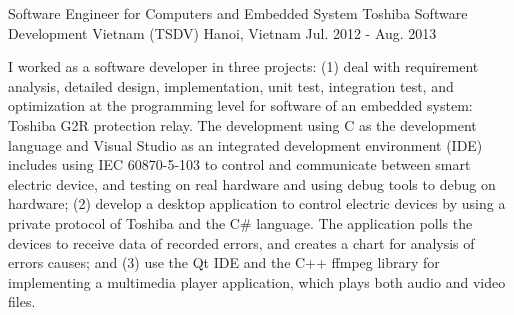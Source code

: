 \begin{cventries}
\cventry
{Software Engineer for Computers and Embedded System} %
{Toshiba Software Development Vietnam (TSDV)} %
{Hanoi, Vietnam} %
{Jul. 2012 - Aug. 2013} %
{ %
	\begin{cvitems}
		\item {I worked as a software developer in three projects: (1) deal with requirement analysis, detailed design, implementation, unit test, integration test, and optimization at the programming level for software of an embedded system: Toshiba G2R protection relay. The development using C as the development language and Visual Studio as an integrated development environment (IDE) includes using IEC 60870-5-103 to control and communicate between smart electric device, and testing on real hardware and using debug tools to debug on hardware; (2) develop a desktop application to control electric devices by using a private protocol of Toshiba and the C\# language. The application polls the devices to receive data of recorded errors, and creates a chart for analysis of errors causes; and (3) use the Qt IDE and the C++ ffmpeg library for implementing a multimedia player application, which plays both audio and video files.}		
	\end{cvitems}
}



\end{cventries}